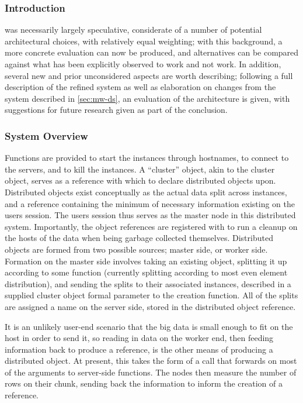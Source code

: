 \subsubsection{Introduction}\label{subsec:further-introduction}

 was necessarily largely speculative, considerate of a number of potential architectural choices, with relatively equal weighting; with this background, a more concrete evaluation can now be produced, and alternatives can be compared against what has been explicitly observed to work and not work.
In addition, several new and prior unconsidered aspects are worth describing; following a full description of the refined system as well as elaboration on changes from the system described in \cref{sec:mw-ds}, an evaluation of the architecture is given, with suggestions for future research given as part of the conclusion.

\subsubsection{System Overview}\label{sec:overview}

Functions are provided to start the instances through hostnames, to connect to the servers, and to kill the instances.
A ``cluster'' object, akin to the  cluster object, serves as a reference with which to declare distributed objects upon.
Distributed objects exist conceptually as the actual data split across  instances, and a reference containing the minimum of necessary information existing on the users \R{} session.
The users \R{} session thus serves as the master node in this distributed system.
Importantly, the object references are registered with  to run a cleanup on the hosts of the data when being garbage collected themselves.
Distributed objects are formed from two possible sources; master side, or worker side.
Formation on the master side involves taking an existing \R{} object, splitting it up according to some function (currently splitting according to most even element distribution), and sending the splits to their associated  instances, described in a supplied cluster object formal parameter to the creation function.
All of the splits are assigned a name on the server side, stored in the distributed object reference.

It is an unlikely user-end scenario that the big data is small enough to fit on the host in order to send it, so reading in data on the worker end, then feeding information back to produce a reference, is the other means of producing a distributed object.
At present, this takes the form of a  call that forwards on most of the arguments to server-side  functions.
The nodes then measure the number of rows on their chunk, sending back the information to inform the creation of a reference.

